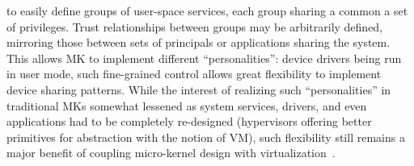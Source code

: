 \documentclass{sig-alternate}
\begin{document}
%
to easily define groups of user-space services, each group sharing a common a set of privileges. Trust relationships between groups may be arbitrarily defined, mirroring those between sets of principals or applications sharing the system. 
This allows MK to implement different ``personalities'': device drivers being run in user mode, such fine-grained control allows great flexibility to implement device sharing patterns.
%
%
%
While the interest of realizing such ``personalities'' in traditional MKs somewhat lessened as system services, drivers, and even applications had to be completely re-designed (hypervisors offering better primitives for abstraction with the notion of VM), 
%
%
%
such flexibility still remains a major benefit of coupling micro-kernel design with virtualization~\cite{OKL4}.


%
\end{document}
